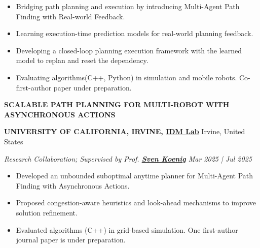 \documentclass[a4paper,9pt]{extarticle}
\begin{document}
\begin{itemize}
    \item Bridging path planning and execution by introducing Multi-Agent Path Finding with Real-world Feedback. 
    \item Learning execution-time prediction models for real-world planning feedback.
    \item Developing a closed-loop planning execution framework with the learned model to replan and reset the dependency. 
    \item Evaluating algorithms(C++, Python) in simulation and mobile robots. Co-first-author paper under preparation.
\end{itemize}
{\textbf{\fontsize{12pt}{4pt}\selectfont S}\textbf{\scshape CALABLE PATH PLANNING FOR MULTI-ROBOT WITH ASYNCHRONOUS ACTIONS}}
\par\vspace{4pt}\noindent
\par\textbf{UNIVERSITY OF CALIFORNIA, IRVINE, {\href{https://idm-lab.org/group.html}{IDM Lab}}} \hfill Irvine, United States  %
\par\textit{Research Collaboration; Supervised by Prof. {\href{https://idm-lab.org/index.html}{\textbf{Sven Koenig}}} \hfill  Mar 2025 | Jul 2025}  %
\begin{itemize}
    \item Developed an unbounded suboptimal anytime planner for Multi-Agent Path Finding with Asynchronous Actions.
    \item Proposed congestion-aware heuristics and look-ahead mechanisms to improve solution refinement.
    \item Evaluated algorithms (C++) in grid-based simulation. One first-author journal paper is under preparation.
\end{itemize}
\end{document}

